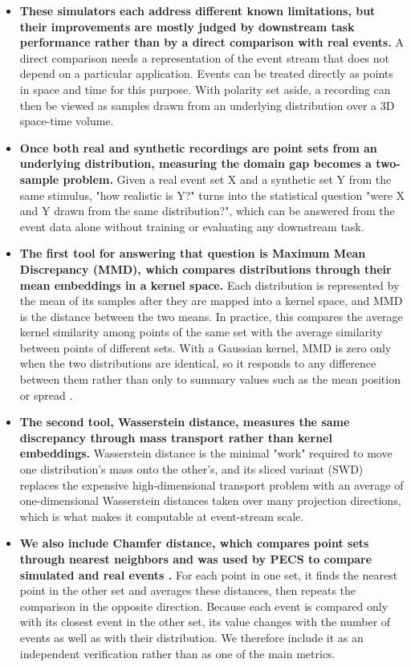 \begin{itemize}
  \item \textbf{These simulators each address different known limitations, but their improvements are mostly judged by downstream task performance rather than by a direct comparison with real events.} A direct comparison needs a representation of the event stream that does not depend on a particular application. Events can be treated directly as points in space and time for this purpose. With polarity set aside, a recording can then be viewed as samples drawn from an underlying distribution over a 3D space-time volume.
  
  \item \textbf{Once both real and synthetic recordings are point sets from an underlying distribution, measuring the domain gap becomes a two-sample problem.} Given a real event set X and a synthetic set Y from the same stimulus, "how realistic is Y?" turns into the statistical question "were X and Y drawn from the same distribution?", which can be answered from the event data alone without training or evaluating any downstream task.
  
  \item \textbf{The first tool for answering that question is Maximum Mean Discrepancy (MMD), which compares distributions through their mean embeddings in a kernel space.} Each distribution is represented by the mean of its samples after they are mapped into a kernel space, and MMD is the distance between the two means. In practice, this compares the average kernel similarity among points of the same set with the average similarity between points of different sets. With a Gaussian kernel, MMD is zero only when the two distributions are identical, so it responds to any difference between them rather than only to summary values such as the mean position or spread \cite{gretton2012kernel}.
  
  \item \textbf{The second tool, Wasserstein distance, measures the same discrepancy through mass transport rather than kernel embeddings.} Wasserstein distance is the minimal "work" required to move one distribution's mass onto the other's, and its sliced variant (SWD) replaces the expensive high-dimensional transport problem with an average of one-dimensional Wasserstein distances taken over many projection directions, which is what makes it computable at event-stream scale. \cite{bonneel2015sliced,flamary2021pot}
  
  \item \textbf{We also include Chamfer distance, which compares point sets through nearest neighbors and was used by PECS to compare simulated and real events \cite{fan2017pointset,han2024pecs}.} For each point in one set, it finds the nearest point in the other set and averages these distances, then repeats the comparison in the opposite direction. Because each event is compared only with its closest event in the other set, its value changes with the number of events as well as with their distribution. We therefore include it as an independent verification rather than as one of the main metrics.
  

\end{itemize}
